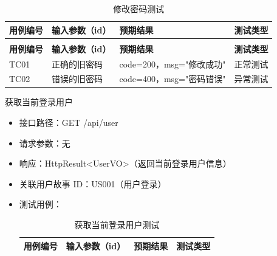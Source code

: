 \begin{levellist}
\begin{levellist}
\begin{itemize}
\begin{longtable}{>{\centering\arraybackslash}m{1.7cm} >{\centering\arraybackslash}m{4cm} >{\centering\arraybackslash}m{5.5cm} >{\centering\arraybackslash}m{1.8cm}}
                      \caption{修改密码测试} \label{tab:training}                                   \\

                      \toprule
                      \textbf{用例编号} & \textbf{输入参数（id）} & \textbf{预期结果}       & \textbf{测试类型} \\
                      \midrule
                      \endfirsthead

                      \multicolumn{4}{c}{{\tablename\ \thetable{} 续表}}                        \\
                      \toprule
                      \textbf{用例编号} & \textbf{输入参数（id）} & \textbf{预期结果}       & \textbf{测试类型} \\
                      \midrule
                      \endhead

                      \bottomrule
                      \endfoot

                      TC01          & 正确的旧密码            & code=200，msg="修改成功" & 正常测试          \\
                      TC02          & 错误的旧密码            & code=400，msg="密码错误" & 异常测试          \\
                  \end{longtable}
        \end{itemize}

        \item 获取当前登录用户
        \begin{itemize}
            \item 接口路径：GET /api/user
            \item 请求参数：无
            \item 响应：HttpResult<UserVO>（返回当前登录用户信息）
            \item 关联用户故事 ID：US001（用户登录）
            \item 测试用例：
                  \begin{longtable}{>{\centering\arraybackslash}m{2cm} >{\centering\arraybackslash}m{4cm} >{\centering\arraybackslash}m{5cm} >{\centering\arraybackslash}m{2cm}}

                      \caption{获取当前登录用户测试} \label{tab:training}                              \\

                      \toprule
                      \textbf{用例编号} & \textbf{输入参数（id）} & \textbf{预期结果}      & \textbf{测试类型} \\
                      \midrule
                      \endfirsthead


\end{longtable}
\end{itemize}
\end{levellist}
\end{levellist}
